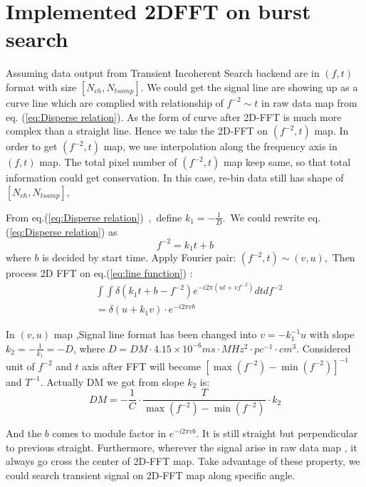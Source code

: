 \documentclass[twocolumn]{aastex61}
\begin{document}
\section{Implemented 2DFFT on burst search}
Assuming data output from Transient Incoherent Search backend are in $(f,t)$ format with size $[N_{ch},N_{tsamp}]$. We could get the signal line are showing up as a curve line which are complied with relationship of $f^{-2}\sim t$ in raw data map from eq. (\ref{eq:Disperse relation}). As the form of curve after 2D-FFT is much more complex than a straight line. Hence we take the 2D-FFT on $(f^{-2},t)$ map. In order to get $(f^{-2},t)$ map, we use interpolation along the frequency axis in $(f,t)$ map. The total pixel number of $(f^{-2},t)$ map keep same, so that total information could get conservation. In this case, re-bin data still has shape of $[N_{ch},N_{tsamp}]$\label{rebin_shape}, 

From eq.(\ref{eq:Disperse relation})~,~define $k_1 =- \frac{1}{D} $.~We could rewrite eq.(\ref{eq:Disperse relation}) as 
\begin{equation}
f^{-2}=k_1t +b\label{eq:line function}
\end{equation}
where $b$ is decided by start time. Apply Fourier pair:
$(f^{-2},t) \sim (v,u)$,~Then process 2D FFT on eq.(\ref{eq:line function}) :
\begin{equation} \begin{aligned}
&\int\int\delta(k_1t+b-f^{-2})e^{-i2\pi(ut+vf^{-2})}dtdf^{-2}
\\ &=\delta(u+k_1v)\cdot e^{-i2\pi vb}
\end{aligned}
\end{equation}

In $(v,u)$ map ,Signal line format has been changed into $v=-k_1^{-1} u$ with slope $k_2 =-\frac{1}{k_1}=-D$, where $D=DM\cdot4.15 \times 10^{-6} ms \cdot MHz^2 \cdot pc^{-1} \cdot cm^3$. Considered unit of $f^{-2}$ and $t$ axis after FFT will become $[\max(f^{-2}) - \min(f^{-2})]^{-1}$ and $T^{-1}$. Actually DM we got from slope $k_2$ is:
\begin{equation}
DM = -\frac{1}{C}\cdot\frac{T}{\max(f^{-2}) - \min(f^{-2})}\cdot k_2 \label{seq:DM Calculate}
\end{equation}

And the $b$ comes to module factor in $e^{-i2\pi vb}$. It is still straight but perpendicular to previous straight. Furthermore,  wherever the signal arise in raw data map , it always go cross the center of 2D-FFT map. Take advantage of these property, we could search transient signal on 2D-FFT map along specific angle. 
\end{document}
